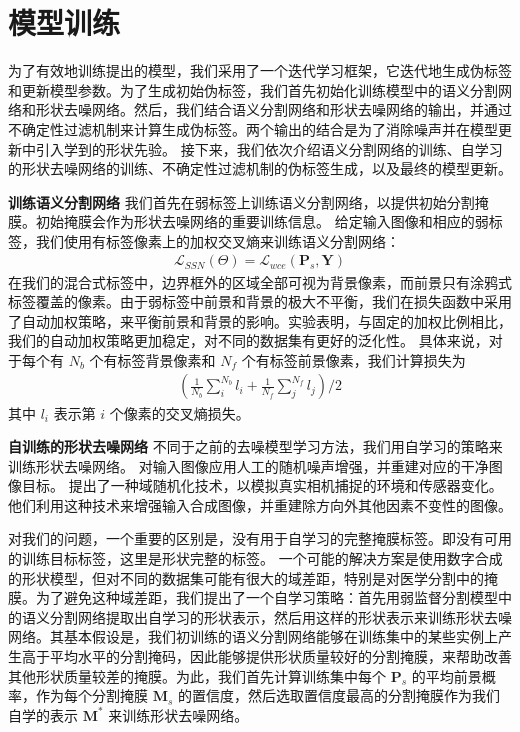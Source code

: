 \section{模型训练}
为了有效地训练提出的模型，我们采用了一个迭代学习框架，它迭代地生成伪标签和更新模型参数。为了生成初始伪标签，我们首先初始化训练模型中的语义分割网络和形状去噪网络。然后，我们结合语义分割网络和形状去噪网络的输出，并通过不确定性过滤机制来计算生成伪标签。两个输出的结合是为了消除噪声并在模型更新中引入学到的形状先验。
接下来，我们依次介绍语义分割网络的训练、自学习的形状去噪网络的训练、不确定性过滤机制的伪标签生成，以及最终的模型更新。

\textbf{训练语义分割网络} \quad 我们首先在弱标签上训练语义分割网络，以提供初始分割掩膜。初始掩膜会作为形状去噪网络的重要训练信息。
给定输入图像和相应的弱标签，我们使用有标签像素上的加权交叉熵来训练语义分割网络：
\begin{align}
    \mathcal{L}_{SSN} (\Theta) = \mathcal{L}_{wce} (\mathbf{P}_s, \mathbf{Y})
\end{align}
在我们的混合式标签中，边界框外的区域全部可视为背景像素，而前景只有涂鸦式标签覆盖的像素。由于弱标签中前景和背景的极大不平衡，我们在损失函数中采用了自动加权策略，来平衡前景和背景的影响。实验表明，与固定的加权比例相比，我们的自动加权策略更加稳定，对不同的数据集有更好的泛化性。
具体来说，对于每个有 $N_b$ 个有标签背景像素和 $N_f$ 个有标签前景像素，我们计算损失为
\begin{align}
    (\frac{1}{N_b} \sum^{N_b}_{i} l_i + \frac{1}{N_f} \sum^{N_f}_{j} l_j) / 2
\end{align}
其中 $l_i$ 表示第 $i$ 个像素的交叉熵损失。

\textbf{自训练的形状去噪网络} \quad 不同于之前的去噪模型学习方法，我们用自学习的策略来训练形状去噪网络。\citet{vincent2010stacked} 对输入图像应用人工的随机噪声增强，并重建对应的干净图像目标。\citet{Sundermeyer_2018_ECCV} 提出了一种域随机化技术，以模拟真实相机捕捉的环境和传感器变化。他们利用这种技术来增强输入合成图像，并重建除方向外其他因素不变性的图像。

对我们的问题，一个重要的区别是，没有用于自学习的完整掩膜标签。即没有可用的训练目标标签，这里是形状完整的标签。
一个可能的解决方案是使用数字合成的形状模型，但对不同的数据集可能有很大的域差距，特别是对医学分割中的掩膜。为了避免这种域差距，我们提出了一个自学习策略：首先用弱监督分割模型中的语义分割网络提取出自学习的形状表示，然后用这样的形状表示来训练形状去噪网络。其基本假设是，我们初训练的语义分割网络能够在训练集中的某些实例上产生高于平均水平的分割掩码，因此能够提供形状质量较好的分割掩膜，来帮助改善其他形状质量较差的掩膜。为此，我们首先计算训练集中每个 $\mathbf{P}_s$ 的平均前景概率，作为每个分割掩膜 $\mathbf{M}_s$ 的置信度，然后选取置信度最高的分割掩膜作为我们自学的表示 $\mathbf{M}^*$ 来训练形状去噪网络。

